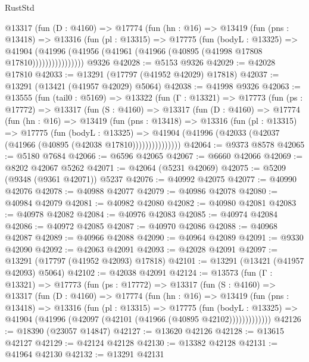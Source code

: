 \begin{lexlean}{RustStd}
\begin{coremodule}
            @13317
              (fun (D : @4160) =>
              @17774
                (fun (hn : @16) =>
                @13419
                  (fun (pns : @13418) =>
                  @13316
                    (fun (pl : @13315) =>
                    @17775
                      (fun (bodyL : @13325) =>
                      @41904
                        (@41996
                          (@41956 (@41961 (@41966 (@40895 (@41998 @17808 @17810))))))))))))))))
    @9326
@42028 := @5153 @9326
@42029 := @42028 @17810
@42033 := @13291 (@17797 (@41952 @42029) @17818)
@42037 := @13291 (@13421 (@41957 @42029) @5064)
@42038 := @41998 @9326
@42063 := @13555
    (fun (tail0 : @5169) =>
    @13322
      (fun (Γ : @13321) =>
      @17773
        (fun (ps : @17772) =>
        @13317
          (fun (S : @4160) =>
          @13317
            (fun (D : @4160) =>
            @17774
              (fun (hn : @16) =>
              @13419
                (fun (pns : @13418) =>
                @13316
                  (fun (pl : @13315) =>
                  @17775
                    (fun (bodyL : @13325) =>
                    @41904 (@41996 (@42033 (@42037 (@41966 (@40895 (@42038 @17810)))))))))))))))
@42064 := @9373 @8578
@42065 := @5180 @7684
@42066 := @6596 @42065
@42067 := @6660 @42066
@42069 := @8202 @42067 @5262
@42071 := @42064 (@5231 @42069)
@42075 := @5209 (@9348 (@9361 @42071)) @5237
@42076 := @40992 @42075
@42077 := @40990 @42076
@42078 := @40988 @42077
@42079 := @40986 @42078
@42080 := @40984 @42079
@42081 := @40982 @42080
@42082 := @40980 @42081
@42083 := @40978 @42082
@42084 := @40976 @42083
@42085 := @40974 @42084
@42086 := @40972 @42085
@42087 := @40970 @42086
@42088 := @40968 @42087
@42089 := @40966 @42088
@42090 := @40964 @42089
@42091 := @9330 @42090
@42092 := @42063 @42091
@42093 := @42028 @42091
@42097 := @13291 (@17797 (@41952 @42093) @17818)
@42101 := @13291 (@13421 (@41957 @42093) @5064)
@42102 := @42038 @42091
@42124 := @13573
    (fun (Γ : @13321) =>
    @17773
      (fun (ps : @17772) =>
      @13317
        (fun (S : @4160) =>
        @13317
          (fun (D : @4160) =>
          @17774
            (fun (hn : @16) =>
            @13419
              (fun (pns : @13418) =>
              @13316
                (fun (pl : @13315) =>
                @17775
                  (fun (bodyL : @13325) =>
                  @41904 (@41996 (@42097 (@42101 (@41966 (@40895 @42102)))))))))))))
@42126 := @18390 (@23057 @14847)
@42127 := @13620 @42126
@42128 := @13615 @42127
@42129 := @42124 @42128
@42130 := @13382 @42128
@42131 := @41964 @42130
@42132 := @13291 @42131

\end{coremodule}
\end{lexlean}

